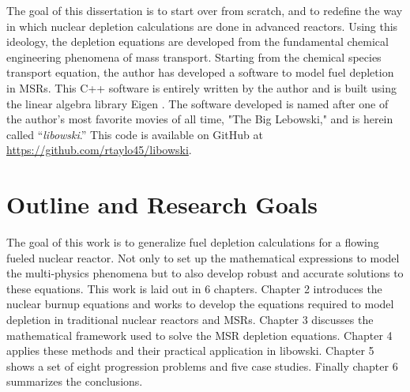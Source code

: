The goal of this dissertation is to start over from scratch, and to redefine the way in which nuclear depletion calculations are done in advanced reactors. Using this ideology, the depletion equations are developed from the fundamental chemical engineering phenomena of mass transport. Starting from the chemical species transport equation, the author has developed a software to model fuel depletion in MSRs. This C++ software is entirely written by the author and is built using the linear algebra library Eigen \cite{eigen}. The software developed is named after one of the author's most favorite movies of all time, "The Big Lebowski," and is herein called ``\textit{libowski}.'' This code is available on GitHub at \href{https://github.com/rtaylo45/libowski}{{\color{blue}https://github.com/rtaylo45/libowski}}.

\section{Outline and Research Goals}

The goal of this work is to generalize fuel depletion calculations for a flowing fueled nuclear reactor. Not only to set up the mathematical expressions to model the multi-physics phenomena but to also develop robust and accurate solutions to these equations. This work is laid out in 6 chapters. Chapter 2 introduces the nuclear burnup equations and works to develop the equations required to model depletion in traditional nuclear reactors and MSRs. Chapter 3 discusses the mathematical framework used to solve the MSR depletion equations. Chapter 4 applies these methods and their practical application in libowski. Chapter 5 shows a set of eight progression problems and five case studies. Finally chapter 6 summarizes the conclusions. 

